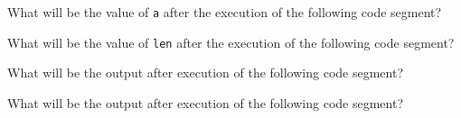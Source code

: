 \documentclass[11pt]{examdesign}
\begin{document}
\begin{multiplechoice}[title={},suppressprefix=yes,rearrange=no]
\begin{question}
What will be the value of \texttt{a} after the execution of the following code segment?
\end{question}
  
\begin{question}
What will be the value of \texttt{len} after the execution of the following code
segment?
\end{question}

\begin{question}
What will be the output after execution of the following code segment?
\end{question}

\begin{question}
What will be the output after execution of the following code segment?
\end{question}

\end{multiplechoice}
\end{document}
